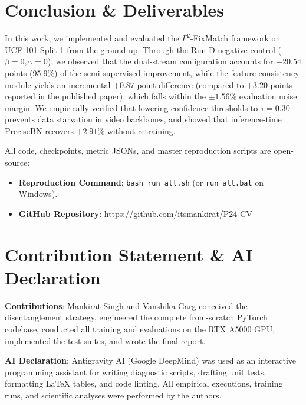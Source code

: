 \documentclass[10pt,twocolumn,a4paper]{article}
\begin{document}
\section{Conclusion \& Deliverables}
\label{sec:conclusion}
In this work, we implemented and evaluated the $F^2$-FixMatch framework on UCF-101 Split 1 from the ground up. Through the Run D negative control ($\beta=0, \gamma=0$), we observed that the dual-stream configuration accounts for $+20.54$ points (95.9\%) of the semi-supervised improvement, while the feature consistency module yields an incremental $+0.87$ point difference (compared to $+3.20$ points reported in the published paper), which falls within the $\pm 1.56\%$ evaluation noise margin. We empirically verified that lowering confidence thresholds to $\tau=0.30$ prevents data starvation in video backbones, and showed that inference-time PreciseBN recovers $+2.91\%$ without retraining. 

All code, checkpoints, metric JSONs, and master reproduction scripts are open-source:
\begin{itemize}
    \item \textbf{Reproduction Command}: \texttt{bash run\_all.sh} (or \texttt{run\_all.bat} on Windows).
    \item \textbf{GitHub Repository}: \url{https://github.com/itsmankirat/P24-CV}
\end{itemize}

\section*{Contribution Statement \& AI Declaration}
\textbf{Contributions}: Mankirat Singh and Vanshika Garg conceived the disentanglement strategy, engineered the complete from-scratch PyTorch codebase, conducted all training and evaluations on the RTX A5000 GPU, implemented the test suites, and wrote the final report.

\textbf{AI Declaration}: Antigravity AI (Google DeepMind) was used as an interactive programming assistant for writing diagnostic scripts, drafting unit tests, formatting LaTeX tables, and code linting. All empirical executions, training runs, and scientific analyses were performed by the authors.
\end{document}
